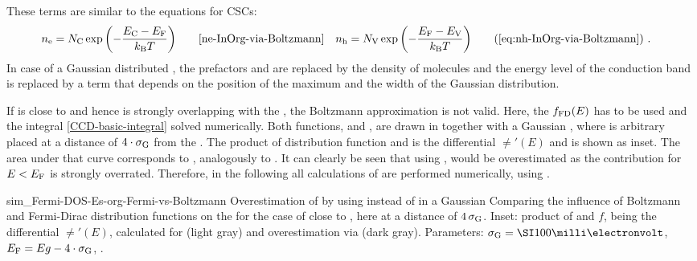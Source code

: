These terms are similar to the equations for CSCs:
\begin{align*}
\ne &=\Nc\exp{-\frac{\Ec-\Ef}{\kT}} \quad\quad\text{\eqref{ne-InOrg-via-Boltzmann}}&  \nh &=\Nv\exp{-\frac{\Ef-\Ev}{\kT}} \tag{\ref{eq:nh-InOrg-via-Boltzmann}}
\PUNKT
\end{align*}
In case of a Gaussian distributed \dosLong, the prefactors \Nc and \Nv are replaced by the density of molecules \nH and the energy level of the conduction band is replaced by a term that depends on the position of the maximum \gausscenter and the width \gausswidth of the Gaussian distribution.

If \Ef is close to \gausscenter and hence \fB is strongly overlapping with the \dosLong, the Boltzmann approximation is not valid. Here, the \fFDLong $f_\text{FD}(E)$ has to be used and the integral \eqref{CCD-basic-integral} solved numerically. Both functions, \fFD and \fB, are drawn in  together with a Gaussian \dos, where \Ef is arbitrary placed at a distance of $4 \cdot \gausswidth$ from the \gausscenter. The product of distribution function and \dos is the differential \neLong $\ne'(E)$ and is shown as inset. The area under that curve corresponds to \neLong \ne, analogously to . It can clearly be seen that using \fB, \ne would be overestimated as the contribution for $E<E_\text{F}$ is strongly overrated. Therefore, in the following all calculations of \neh are performed numerically, using \fFD.

\cBild
{sim_Fermi-DOS-Es-org-Fermi-vs-Boltzmann}
{Overestimation of \ne by using \fB instead of \fFD in a Gaussian \dos}
{Comparing the influence of Boltzmann \fB and Fermi-Dirac \fFD distribution functions on the \neLong \ne for the case of \Ef close to \gausscenter, here at a distance of $4\,\gausswidth$. Inset: product of \dos and $f$, being the differential \neLong $\ne'(E)$, calculated for \fFD (light gray) and overestimation via \fB (dark gray). Parameters: \mbox{$\gausswidth=\meV{100}$}, \mbox{$\Ef=Eg-4 \cdot \gausswidth$}, \T[25].
}

